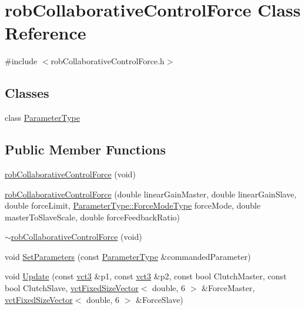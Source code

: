 \hypertarget{classrob_collaborative_control_force}{\section{rob\-Collaborative\-Control\-Force Class Reference}
\label{classrob_collaborative_control_force}
}


{\ttfamily \#include $<$rob\-Collaborative\-Control\-Force.\-h$>$}

\subsection*{Classes}
\begin{DoxyCompactItemize}
\item 
class \hyperlink{classrob_collaborative_control_force_1_1_parameter_type}{Parameter\-Type}
\end{DoxyCompactItemize}
\subsection*{Public Member Functions}
\begin{DoxyCompactItemize}
\item 
\hyperlink{classrob_collaborative_control_force_a1e7ed34f7df30aed3771083cdce02a95}{rob\-Collaborative\-Control\-Force} (void)
\item 
\hyperlink{classrob_collaborative_control_force_ae09387a96e509acf75adda78f266fdc7}{rob\-Collaborative\-Control\-Force} (double linear\-Gain\-Master, double linear\-Gain\-Slave, double force\-Limit, \hyperlink{classrob_collaborative_control_force_1_1_parameter_type_ab4ec71e97ffffd412993ea4f307e9acf}{Parameter\-Type\-::\-Force\-Mode\-Type} force\-Mode, double master\-To\-Slave\-Scale, double force\-Feedback\-Ratio)
\item 
\hyperlink{classrob_collaborative_control_force_add898dc0e9b783f0659b3c1a455d7b16}{$\sim$rob\-Collaborative\-Control\-Force} (void)
\item 
void \hyperlink{classrob_collaborative_control_force_a8b6ee9968a8328b0de3588b9bc0143fc}{Set\-Parameters} (const \hyperlink{classrob_collaborative_control_force_1_1_parameter_type}{Parameter\-Type} \&commanded\-Parameter)
\item 
void \hyperlink{classrob_collaborative_control_force_a31bbb39e19d2fec0bebf83fd256d5394}{Update} (const \hyperlink{vct_fixed_size_vector_types_8h_a3af82acdbf4eeb73c551909240b106ea}{vct3} \&p1, const \hyperlink{vct_fixed_size_vector_types_8h_a3af82acdbf4eeb73c551909240b106ea}{vct3} \&p2, const bool Clutch\-Master, const bool Clutch\-Slave, \hyperlink{classvct_fixed_size_vector}{vct\-Fixed\-Size\-Vector}$<$ double, 6 $>$ \&Force\-Master, \hyperlink{classvct_fixed_size_vector}{vct\-Fixed\-Size\-Vector}$<$ double, 6 $>$ \&Force\-Slave)
\end{DoxyCompactItemize}
